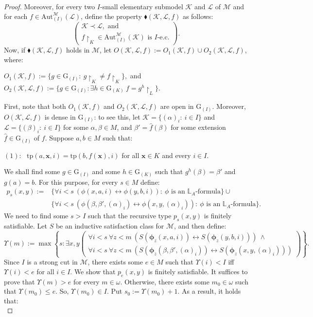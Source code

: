 \documentclass[11pt]{article}
\theoremstyle{plain}
\theoremstyle{definition}
\newcommand{\M}{\mathcal{M}}
\newcommand{\K}{\mathcal{K}}
\newcommand{\LL}{\mathcal{L}}
\newcommand{\G}{\mathrm{G}}
\newcommand{\A}{\mathrm{Aut}}
\newcommand{\Aa}{\A_{(I)}^{\M}(\K)}
\newcommand{\tp}{\mathrm{tp}}
\begin{document}
\begin{proof}
Moreover,  for every two  $I$-small elementary submodel $ \K$ and $ \mathcal{L} $ of $\M$ and for each $ {f\in\A_{(I)}^{\M}(\mathcal{L})}$, define the  property $\blacklozenge(\K,\LL,f)$ as follows:
	$$ \left(\begin{array}{c}
	\K\prec\mathcal{L}, \text{ and }\\
f\upharpoonright_{K}\in\Aa \text{ is } I\text{-e.c.}
\end{array}\right).$$
  Now, if $\blacklozenge(\K,\LL,f)$ holds in $\M$,  let $ O(\K,\mathcal{L},f):=O_{1}(\K,f)\cup O_{2}(\K,\mathcal{L},f)$, where:
\begin{center}
	$O_{1}(\K,f):=\{g\in\G_{(I)}: \ g\upharpoonright_{K}\neq f\upharpoonright_{K}\},$ and \\
	$O_{2}(\K,\mathcal{L},f):=\{g\in\G_{(I)}: \exists h\in\G_{(K)} \ f= g^{h}\upharpoonright_{L} \}.$
\end{center} 
First, note  that both $O_{1}(\K,f)$ and $O_{2}(\K,\LL,f)$ are open in $\G_{(I)}$. Moreover, $O(\K,\mathcal{L},f)$ is dense in $\G_{(I)}$: to see this, let $\K=\{(\alpha)_{i}: \ i\in I\}$ and $\mathcal{L}=\{(\beta)_{i}: \ i\in I\}$ for some $\alpha,\beta\in M$, and  $\beta'=\hat{f}(\beta)$ for some extension $\hat{f}\in\G_{(I)}$ of $f$. Suppose $a,b\in M$ such that:
\begin{center}
$(1): \  \ \ $$\tp(a,\textbf{x},i)=\tp(b,f(\textbf{x}),i)$ for all $\textbf{x}\in K$ and every $i\in I$.
\end{center}    We shall find some $g\in\G_{(I)}$ and some $h\in\G_{(K)}$ such that $g^{h}(\beta)=\beta'$ and $g(a)=b$. For this purpose, for every $s\in M $ define:
\begin{align*}
		p_{s}(x,y):=&\{\forall i<s \ (\phi(x,a,i)\leftrightarrow\phi(y,b,i)): \ \phi  \text{ is an } \mathbb{L}_{A}\text{-formula}\}\cup\\ &
	\{  \forall i<s \ (\phi(\beta,\beta',(\alpha)_{i})\leftrightarrow\phi(x,y,(\alpha)_{i})): \ \phi  \text{ is an } \mathbb{L}_{A}\text{-formula}\}.
\end{align*}
We need to find some $s>I$ such that the recursive type $p_{s}(x,y )$ is finitely satisfiable. Let $S$ be an inductive satisfaction class for $\M$, and then  define: 
$$\Upsilon(m):= \max\left\lbrace s: \exists x,y \left(\begin{array}{c}
	\forall i<s \ \forall z<m \  (S(\bm{\phi}_{z}(x,a,i))\leftrightarrow S(\bm{\phi}_{z}(y,b,i))) \ \wedge\\
	\forall i<s  \ \forall z<m \ (S(\bm{\phi}_{z}(\beta,\beta',(\alpha)_{i}))\leftrightarrow S(\bm{\phi}_{z}(x,y,(\alpha)_{i})))
\end{array}\right)  \right\rbrace.$$
Since $I$ is a strong cut in $\M$, there exists some  $e\in M$ such that $\Upsilon(i)<I$ iff $\Upsilon(i)<e$ for all $i\in I$. We show that $p_{e}(x,y)$ is finitely satisfiable. It suffices to prove that $\Upsilon(m)>e$ for every $m\in\omega$. Otherwise, there exists some $m_{0}\in\omega$ such that $\Upsilon(m_{0})\leq e$. So, $\Upsilon(m_{0})\in I$. Put $s_{0}:=\Upsilon(m_{0})+1$. As a result, it holds that:\\


\end{proof}
\end{document}
